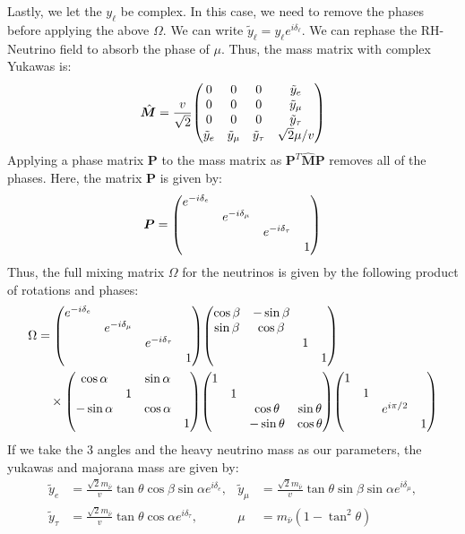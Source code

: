 \documentclass[a4paper,11pt]{article} \pdfoutput=1
\newcommand{\rhn}{\bar{\nu}}
\begin{document}
Lastly, we let the \(y_{\ell}\) be complex. In this case, we need to remove the
phases before applying the above \(\Omega\). We can write
\(\tilde{y}_{\ell}= y_{\ell}e^{i\delta_{\ell}}\). We can rephase the RH-Neutrino field
to absorb the phase of \(\mu\). Thus, the mass matrix with complex Yukawas is:
\begin{align}
	\hat{\bm{M}} = \frac{v}{\sqrt{2}}\mqty(
	0             & 0               & 0                & \tilde{y}_{e}    \\
	0             & 0               & 0                & \tilde{y}_{\mu}  \\
	0             & 0               & 0                & \tilde{y}_{\tau} \\
	\tilde{y}_{e} & \tilde{y}_{\mu} & \tilde{y}_{\tau} & \sqrt{2}\mu/v    \\
	)
\end{align}
Applying a phase matrix \(\bm{P}\) to the mass matrix as \(\bm{P}^{T}\hat{\bm{M}}\bm{P}\)
removes all of the phases. Here, the matrix \(\bm{P}\) is given by:
\begin{align}
	\bm{P}
	=
	\mqty(\dmat{
		e^{-i\delta_{e}} ,
		e^{-i\delta_{\mu}},
		e^{-i\delta_{\tau}},
		1
	})
\end{align}
Thus, the full mixing matrix \(\Omega\) for the neutrinos is given by the following product of
rotations and phases:
\begin{align}
	\Omega      & =
	\mqty(\dmat{
		e^{-i\delta_{e}} ,
		e^{-i\delta_{\mu}},
		e^{-i\delta_{\tau}},
		1
	})
	\mqty(
	\dmat{
	\cos\beta   & -\sin\beta                   \\
	\sin\beta   & \cos\beta,1,1}
	)                                          \\
	            & \quad\times
	\mqty(\dmat{
	\cos\alpha  &                & \sin\alpha  \\
	            & 1              &             \\
	-\sin\alpha &                & \cos\alpha,
		1
	})
	\mqty(\dmat{
		1,1,
	\cos\theta  & \sin\theta                   \\
	-\sin\theta & \cos\theta                   \\
	})
	\mqty(\dmat{1,1,e^{i\pi/2},1})
\end{align}
If we take the 3 angles and the heavy neutrino mass as our parameters, the
yukawas and majorana mass are given by:
\begin{align}
	\tilde{y}_{e}    & =\frac{\sqrt{2}m_{\rhn}}{v}\tan\theta\cos\beta\sin\alpha e^{i\delta_{e}},   &
	\tilde{y}_{\mu}  & =\frac{\sqrt{2}m_{\rhn}}{v}\tan\theta\sin\beta\sin\alpha e^{i\delta_{\mu}},   \\
	\tilde{y}_{\tau} & =\frac{\sqrt{2}m_{\rhn}}{v}\tan\theta\cos\alpha e^{i\delta_{\tau}},         &
	\mu              & = m_{\rhn}(1-\tan^2\theta)
\end{align}
\end{document}
